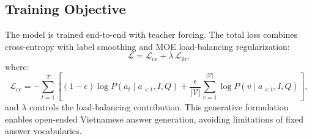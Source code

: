 \subsection{Training Objective}
\label{sec:method:training}

The model is trained end-to-end with teacher forcing. The total loss combines cross-entropy with label smoothing and MOE load-balancing regularization:
\begin{equation}
    \mathcal{L} = \mathcal{L}_{\text{ce}} + \lambda \, \mathcal{L}_{\text{lb}},
    \label{eq:total_loss}
\end{equation}
where:
\begin{equation}
    \mathcal{L}_{\text{ce}} = - \sum_{t=1}^{T} \left[(1 - \epsilon) \log P(a_t \mid a_{<t}, I, Q) + \frac{\epsilon}{|\mathcal{V}|} \sum_{v=1}^{|\mathcal{V}|} \log P(v \mid a_{<t}, I, Q)\right],
    \label{eq:ce_loss}
\end{equation}
and $\lambda$ controls the load-balancing contribution. This generative formulation enables open-ended Vietnamese answer generation, avoiding limitations of fixed answer vocabularies.